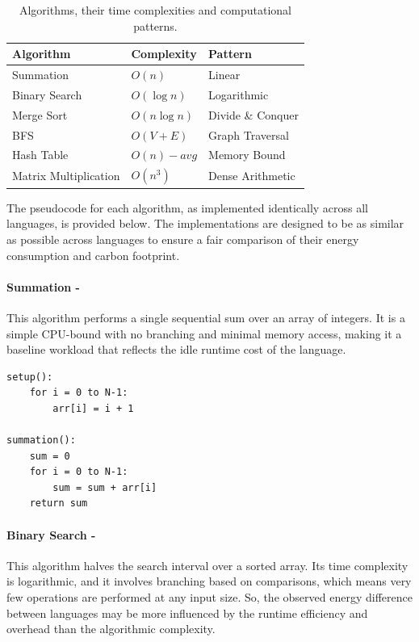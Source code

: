 \begin{table}[h]
    \centering
    \caption{Algorithms, their time complexities and computational patterns.}\label{tab:algorithms}
    \small
    \begin{tabular}{lll}
        \hline
        \textbf{Algorithm} & \textbf{Complexity} & \textbf{Pattern} \\
        \hline
        Summation                      & $O(n)$            & Linear \\
        Binary Search                  & $O(\log n)$       & Logarithmic \\
        Merge Sort                     & $O(n \log n)$     & Divide \& Conquer \\
        BFS     & $O(V + E)$        & Graph Traversal \\
        Hash Table                     & $O(n) - avg $             &  Memory Bound \\
        Matrix Multiplication          & $O(n^3)$          & Dense Arithmetic  \\
        \hline
    \end{tabular}
\end{table}

The pseudocode for each algorithm, as implemented identically across all languages, is provided below. The implementations are designed to be as similar as possible across languages to ensure a fair comparison of their energy consumption and carbon footprint.


\paragraph{Summation -}
    This algorithm performs a single sequential sum over an array of integers. It is a simple CPU-bound with no branching and minimal memory access, making it a baseline workload that reflects the idle runtime cost of the language. 

\begin{lstlisting}[caption={Summation pseudocode}, label={lst:summation}, numbers=none]
setup():
    for i = 0 to N-1:
        arr[i] = i + 1
 
summation():
    sum = 0
    for i = 0 to N-1:
        sum = sum + arr[i]
    return sum
\end{lstlisting}


\paragraph{Binary Search -}
    This algorithm halves the search interval over a sorted array. Its time complexity is logarithmic, and it involves branching based on comparisons, which means very few operations are performed at any input size. So, the observed energy difference between languages may be more influenced by the runtime efficiency and overhead than the algorithmic complexity.

